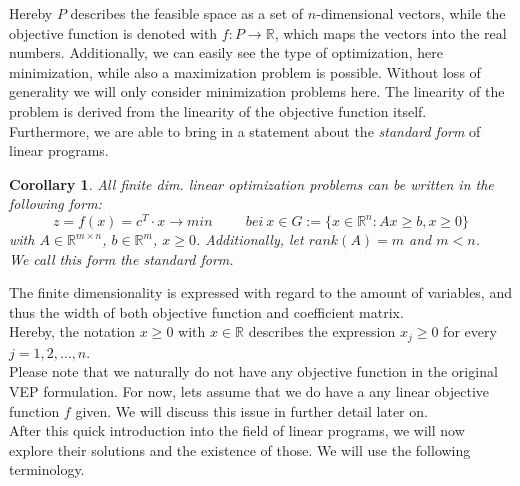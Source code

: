 \documentclass[a4paper, 11pt]{article}
\newtheorem{corollary}{Corollary}
\begin{document}
Hereby $P$ describes the feasible space as a set of $n$-dimensional vectors, while the objective function is denoted with $f:P\rightarrow\mathbb{R}$, which maps the vectors into the real numbers. Additionally, we can easily see the type of optimization, here minimization, while also a maximization problem is possible. Without loss of generality we will only consider minimization problems here. The linearity of the problem is derived from the linearity of the objective function itself. \\

Furthermore, we are able to bring in a statement about the \textit{standard form} of linear programs. \\
\begin{corollary}
	All finite dim. linear optimization problems can be written in the following form:\\
	\begin{equation}
		\label{standardform}
		z = f(x) = c^T \cdot x \rightarrow min \hspace{1cm} bei\ x \in G:=\{x \in \mathbb{R}^n: Ax \geq b, x \geq 0\}
	\end{equation}
	with $A\in \mathbb{R}^{m\times n}$, $b\in\mathbb{R}^m$, $x\geq 0$. Additionally, let $rank(A)=m$ and $m< n$.\\
	We call this form the \textit{standard form}.
\end{corollary}
The finite dimensionality is expressed with regard to the amount of variables, and thus the width of both objective function and coefficient matrix. \\

Hereby, the notation $x\geq0$ with $x\in \mathbb{R}$ describes the expression $x_j\geq 0$ for every $j=1,2,\dots,n$.\\ 
Please note that we naturally do not have any objective function in the original VEP formulation. For now, lets assume that we do have a any linear objective function $f$ given. We will discuss this issue in further detail later on.\\
After this quick introduction into the field of linear programs, we will now explore their solutions and the existence of those. We will use the following terminology.
\end{document}
